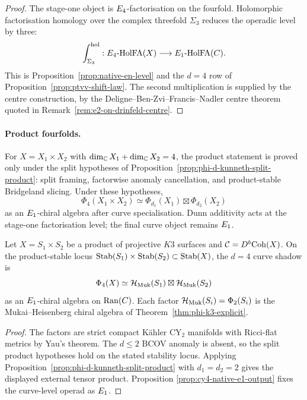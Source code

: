 \begin{proof}
The stage-one object is \(E_4\)-factorisation on the fourfold. Holomorphic
factorisation homology over the complex threefold \(\Sigma_3\) reduces the
operadic level by three:
\[
  \int_{\Sigma_3}^{\mathrm{hol}}:
  E_4\text{-}\mathrm{HolFA}(X)\longrightarrow
  E_1\text{-}\mathrm{HolFA}(C).
\]
This is Proposition~\ref{prop:native-en-level} and the \(d=4\) row of
Proposition~\ref{prop:ptvv-shift-law}. The second multiplication is supplied
by the centre construction, by the Deligne--Ben-Zvi--Francis--Nadler
centre theorem quoted in Remark~\ref{rem:e2-on-drinfeld-centre}.
\end{proof}

\paragraph{Product fourfolds.}
For \(X=X_1\times X_2\) with \(\dim_{\mathbb{C}}X_1+\dim_{\mathbb{C}}X_2=4\), the
product statement is proved only under the split hypotheses of
Proposition~\ref{prop:phi-d-kunneth-split-product}: split framing,
factorwise anomaly cancellation, and product-stable Bridgeland slicing.
Under these hypotheses,
\[
  \Phi_4(X_1\times X_2)
  \simeq
  \Phi_{d_1}(X_1)\boxtimes\Phi_{d_2}(X_2)
\]
as an \(E_1\)-chiral algebra after curve specialisation. Dunn additivity
acts at the stage-one factorisation level; the final curve object remains
\(E_1\).

\begin{theorem}[\(K3\times K3\)]
\label{thm:cy4-k3-k3-product}
Let \(X=S_1\times S_2\) be a product of projective \(K3\) surfaces and
\(\mathcal{C}=D^b\mathrm{Coh}(X)\). On the product-stable locus
\(\mathrm{Stab}(S_1)\times\mathrm{Stab}(S_2)\subset\mathrm{Stab}(X)\), the \(d=4\) curve
shadow is
\[
  \Phi_4(X)
  \simeq
  \mathcal{H}_{\mathrm{Muk}}(S_1)\boxtimes\mathcal{H}_{\mathrm{Muk}}(S_2)
\]
as an \(E_1\)-chiral algebra on \(\mathrm{Ran}(C)\). Each factor
\(\mathcal{H}_{\mathrm{Muk}}(S_i)=\Phi_2(S_i)\) is the Mukai--Heisenberg chiral
algebra of Theorem~\ref{thm:phi-k3-explicit}.
\end{theorem}

\begin{proof}
The factors are strict compact K\"ahler CY\(_2\) manifolds with Ricci-flat
metrics by Yau's theorem. The \(d\leq2\) BCOV anomaly is absent, so the
split product hypotheses hold on the stated stability locus. Applying
Proposition~\ref{prop:phi-d-kunneth-split-product} with \(d_1=d_2=2\)
gives the displayed external tensor product. Proposition
\ref{prop:cy4-native-e1-output} fixes the curve-level operad as \(E_1\).
\end{proof}

